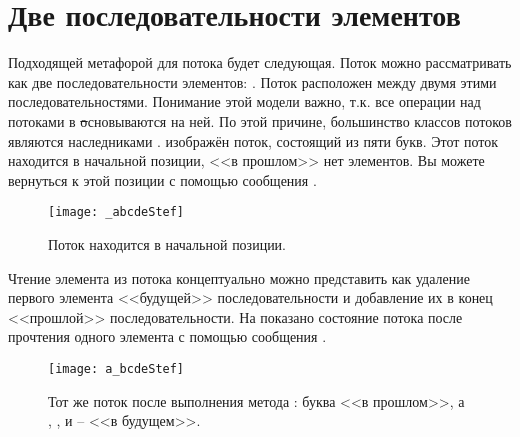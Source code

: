 \documentclass[a4paper,10pt,twoside]{book}
\begin{document}
\section{Две последовательности элементов}
Подходящей метафорой для потока будет следующая. Поток можно рассматривать как две последовательности элементов: .
Поток расположен между двумя этими последовательностями.
Понимание этой модели важно, т.к. все операции над потоками в \st основываются на ней.
По этой причине, большинство классов потоков являются наследниками .
 изображён поток, состоящий из пяти букв. Этот поток находится в начальной позиции, \ie <<в прошлом>> нет элементов. Вы можете вернуться к этой позиции с помощью сообщения .

\begin{figure}[ht]
\centerline{\texttt{[image: \_abcdeStef]}}
\caption{Поток находится в начальной позиции.}
\vspace{.2in}
\end{figure}

Чтение элемента из потока концептуально можно представить как удаление первого элемента <<будущей>> последовательности и добавление их в конец <<прошлой>> последовательности. На  показано состояние потока после прочтения одного элемента с помощью сообщения .

\begin{figure}[ht]
\centerline{\texttt{[image: a\_bcdeStef]}}
\caption{Тот же поток после выполнения метода : буква  <<в прошлом>>, а , ,  и  -- <<в будущем>>.}
\vspace{.2in}
\end{figure}
\end{document}

